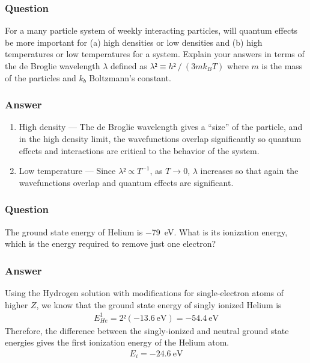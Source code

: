 \subsubsection{Question}

For a many particle system of weekly interacting particles, will quantum
effects be more important for (a) high densities or low densities and (b)
high temperatures or low temperatures for a system. Explain your answers in
terms of the de Broglie wavelength $λ$ defined as $λ² ≡ h²⁄(3mk_BT)$ where
$m$ is the mass of the particles and $k_b$ Boltzmann's constant.

\subsubsection{Answer}
\renewcommand{\labelenumi}{(\alph{enumi})}
\begin{enumerate}
	\item
		High density — The de Broglie wavelength gives a ``size'' of the
		particle, and in the high density limit, the wavefunctions overlap
		significantly so quantum effects and interactions are critical to
		the behavior of the system.
	\item
		Low temperature — Since $λ² \propto T^{-1}$, as $T → 0$, $λ$ increases
		so that again the wavefunctions overlap and quantum effects are
		significant.
\end{enumerate}

\subsubsection{Question}

The ground state energy of Helium is \SI{-79}{\eV}. What is its ionization
energy, which is the energy required to remove just one electron?

\subsubsection{Answer}
Using the Hydrogen solution with modifications for single-electron atoms of
higher $Z$, we know that the ground state energy of singly ionized Helium is
\begin{align*}
	E_{He}^{1} = 2² (\SI{-13.6}{\eV}) = \SI{-54.4}{\eV}
\end{align*}
Therefore, the difference between the singly-ionized and neutral ground state
energies gives the first ionization energy of the Helium atom.
\begin{align}
	\boxed{
	E_i = \SI{-24.6}{\eV}
	}
\end{align}

